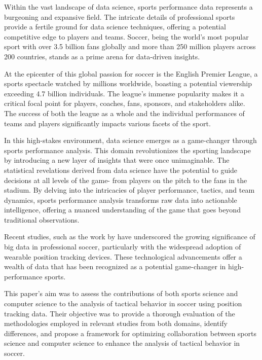 \documentclass[12pt]{article}
\begin{document}
Within the vast landscape of data science, sports performance data represents a
burgeoning and expansive field. The intricate details of professional sports
provide a fertile ground for data science techniques, offering a potential
competitive edge to players and teams. Soccer, being the world's most popular
sport with over 3.5 billion fans globally and more than 250 million players
across 200 countries, stands as a prime arena for data-driven insights.

At the epicenter of this global passion for soccer is the English Premier League,
a sports spectacle watched by millions worldwide, boasting a potential viewership
exceeding 4.7 billion individuals. The league's immense popularity makes it a
critical focal point for players, coaches, fans, sponsors, and stakeholders alike.
The success of both the league as a whole and the individual performances of teams
and players significantly impacts various facets of the sport.

In this high-stakes environment, data science emerges as a game-changer through
sports performance analysis. This domain revolutionizes the sporting landscape
by introducing a new layer of insights that were once unimaginable. The
statistical revelations derived from data science have the potential to guide
decisions at all levels of the game- from players on the pitch to the fans in
the stadium. By delving into the intricacies of player performance, tactics, and
team dynamics, sports performance analysis transforms raw data into actionable
intelligence, offering a nuanced understanding of the game that goes beyond
traditional observations.


Recent studies, such as the work by \citet{goes2021unlocking} have underscored
the growing significance of big data in professional soccer, particularly with
the widespread adoption of wearable position tracking devices. These technological
advancements offer a wealth of data that has been recognized as a potential
game-changer in high-performance sports. 

This paper's aim was to assess the contributions of both sports science and
computer science to the analysis of tactical behavior in soccer using position
tracking data. Their objective was to provide a thorough evaluation of the
methodologies employed in relevant studies from both domains, identify
differences, and propose a framework for optimizing collaboration between sports
science and computer science to enhance the analysis of tactical behavior in soccer.
\end{document}
